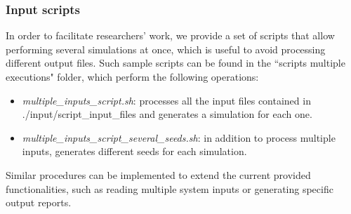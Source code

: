 \documentclass[a4paper]{article}
\begin{document}
		\subsubsection{Input scripts}
		\label{section:input_scripts}	
		In order to facilitate researchers' work, we provide a set of scripts that allow performing several simulations at once, which is useful to avoid processing different output files. Such sample scripts can be found in the ``scripts multiple executions" folder, which perform the following operations:
		\begin{itemize}
			\item \emph{multiple\_inputs\_script.sh}: processes all the input files contained in ./input/script\_input\_files and generates a simulation for each one. 
			\item \emph{multiple\_inputs\_script\_several\_seeds.sh}: in addition to process multiple inputs, generates different seeds for each simulation.
		\end{itemize}
		
		Similar procedures can be implemented to extend the current provided functionalities, such as reading multiple system inputs or generating specific output reports.
		
\end{document}
